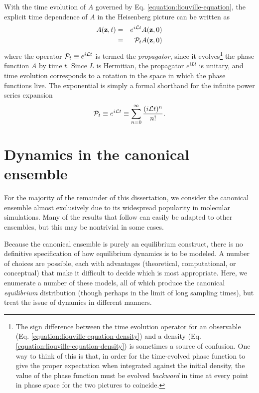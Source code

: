 With the time evolution of $A$ governed by Eq. \ref{equation:liouville-equation}, the explicit time dependence of $A$ in the Heisenberg picture can be written as
\begin{eqnarray}
A({\bf z},t) &=& e^{i \mathcal{L} t} A({\bf z},0) \nonumber \\
&=& \mathcal{P}_t A({\bf z},0)
\end{eqnarray}
where the operator $\mathcal{P}_t \equiv e^{i \mathcal{L} t}$ is termed the \emph{propagator}, since it evolves\footnote{The sign difference between the time evolution operator for an observable (Eq. \ref{equation:liouville-equation-density}) and a density (Eq. \ref{equation:liouville-equation-density}) is sometimes a source of confusion.  One way to think of this is that, in order for the time-evolved phase function to give the proper expectation when integrated against the initial density, the value of the phase function must be evolved \emph{backward} in time at every point in phase space for the two pictures to coincide.} the phase function $A$ by time $t$.   \label{notation:propagator}
Since $L$ is Hermitian, the propagator $e^{iLt}$ is unitary, and time evolution corresponds to a rotation in the space in which the phase functions live.
The exponential is simply a formal shorthand for the infinite power series expansion
\begin{eqnarray}
\mathcal{P}_t \equiv e^{i \mathcal{L} t} \equiv \sum_{n=0}^\infty \frac{(i \mathcal{L} t)^n}{n!}.
\end{eqnarray}

\section{Dynamics in the canonical ensemble}

For the majority of the remainder of this dissertation, we consider the canonical ensemble almost exclusively due to its widespread popularity in molecular simulations.
Many of the results that follow can easily be adapted to other ensembles, but this may be nontrivial in some cases.

Because the canonical ensemble is purely an equilibrium construct, there is no definitive specification of how equilibrium dynamics is to be modeled.
A number of choices are possible, each with advantages (theoretical, computational, or conceptual) that make it difficult to decide which is most appropriate.
Here, we enumerate a number of these models, all of which produce the canonical \emph{equilibrium} distribution (though perhaps in the limit of long sampling times), but treat the issue of dynamics in different manners.

